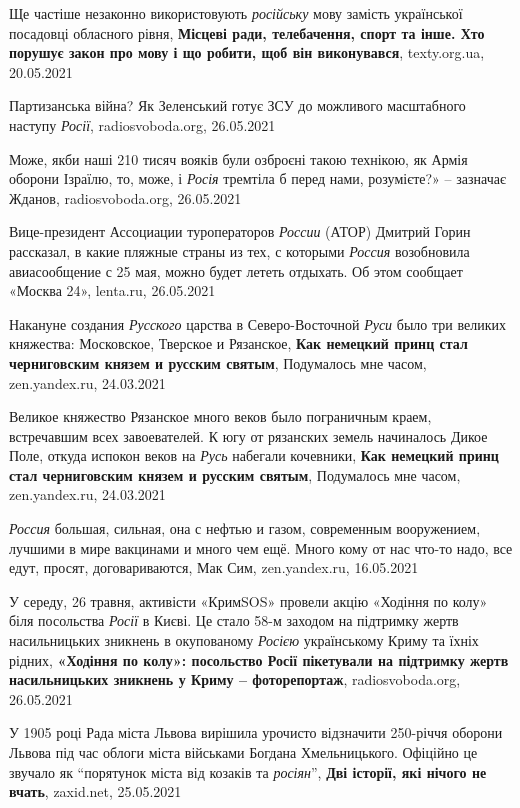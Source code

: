 Ще частіше незаконно використовують \emph{російську} мову замість української
посадовці обласного рівня, \textbf{Місцеві ради, телебачення, спорт та інше.
Хто порушує закон про мову і що робити, щоб він виконувався}, texty.org.ua,
20.05.2021

Партизанська війна? Як Зеленський готує ЗСУ до можливого масштабного наступу
\emph{Росії}, radiosvoboda.org, 26.05.2021

Може, якби наші 210 тисяч вояків були озброєні такою технікою, як Армія оборони
Ізраїлю, то, може, і \emph{Росія} тремтіла б перед нами, розумієте?» – зазначає
Жданов, radiosvoboda.org, 26.05.2021

Вице-президент Ассоциации туроператоров \emph{России} (АТОР) Дмитрий Горин
рассказал, в какие пляжные страны из тех, с которыми \emph{Россия} возобновила
авиасообщение с 25 мая, можно будет лететь отдыхать. Об этом сообщает «Москва
24», lenta.ru, 26.05.2021

Накануне создания \emph{Русского} царства в Северо-Восточной \emph{Руси} было
три великих княжества: Московское, Тверское и Рязанское, \textbf{Как немецкий
принц стал черниговским князем и русским святым}, Подумалось мне часом,
zen.yandex.ru, 24.03.2021

Великое княжество Рязанское много веков было пограничным краем, встречавшим
всех завоевателей. К югу от рязанских земель начиналось Дикое Поле, откуда
испокон веков на \emph{Русь} набегали кочевники, \textbf{Как немецкий принц
стал черниговским князем и русским святым}, Подумалось мне часом,
zen.yandex.ru, 24.03.2021

\emph{Россия} большая, сильная, она с нефтью и газом, современным вооружением,
лучшими в мире вакцинами и много чем ещё. Много кому от нас что-то надо, все
едут, просят, договариваются, Мак Сим, zen.yandex.ru, 16.05.2021

У середу, 26 травня, активісти «КримSOS» провели акцію «Ходіння по колу» біля
посольства \emph{Росії} в Києві. Це стало 58-м заходом на підтримку жертв
насильницьких зникнень в окупованому \emph{Росією} українському Криму та їхніх рідних,
\textbf{«Ходіння по колу»: посольство Росії пікетували на підтримку жертв насильницьких зникнень у Криму – фоторепортаж},
radiosvoboda.org, 26.05.2021

У 1905 році Рада міста Львова вирішила урочисто відзначити 250-річчя оборони
Львова під час облоги міста військами Богдана Хмельницького. Офіційно це
звучало як \enquote{порятунок міста від козаків та \emph{росіян}}, \textbf{Дві
історії, які нічого не вчать}, zaxid.net, 25.05.2021

